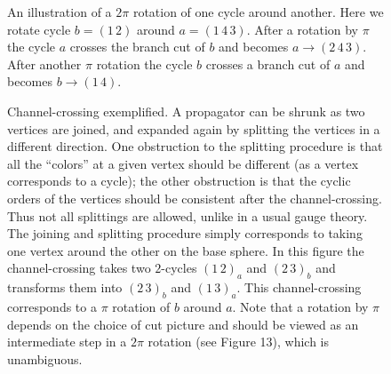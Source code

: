 \documentclass[letterpaper]{JHEP3}
\begin{document}
\begin{figure}[htbp]
\begin{center}
\caption{An illustration of a $2\pi$ rotation of one cycle around another. Here we 
rotate cycle $b=(1\, 2)$ around $a=(1\,4\, 3)$. After a rotation by $\pi$ the cycle $a$ crosses the branch cut of $b$
and becomes $a\to (2\,4\,3)$. After another $\pi$ rotation the cycle $b$ crosses a branch cut of $a$ and becomes $b\to (1\, 4)$.
} \label{pirot2}
\end{center}
\end{figure}


\begin{figure}[htbp]
 \begin{center} 
\caption{Channel-crossing exemplified. A propagator can  be shrunk as two vertices
are joined, 
and  expanded again by splitting the vertices in a different direction. One obstruction to the splitting  procedure
is that all the ``colors'' at a given vertex should be different (as a vertex corresponds to a cycle);
 the other obstruction
is that the cyclic orders of the vertices should be consistent after the channel-crossing.
 Thus not all splittings are allowed, unlike in a usual gauge theory.
The joining and splitting procedure simply corresponds to taking one vertex around the other on the base sphere.
In this figure the channel-crossing takes two $2$-cycles $(1\,2)_a$ and $(2\,3)_b$ and
transforms them into $(2\,3)_b$ and $(1\,3)_a$. This channel-crossing corresponds to a $\pi$ rotation of
$b$ around $a$. Note that a rotation by $\pi$ depends on the choice of cut picture and should be viewed as an intermediate
step in a $2\pi$ rotation (see Figure 13), which is unambiguous. } \label{channel} 
\end{center}
\end{figure} 	
\end{document}

